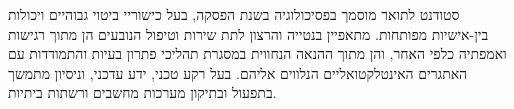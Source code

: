 \begin{minipage}[t]{1\linewidth}
	\vspace{0.25cm} %
	סטודנט לתואר מוסמך בפסיכולוגיה בשנת הפסקה, בעל כישוריי ביטוי גבוהיים ויכולות בין-אישיות מפותחות. מתאפיין בנטייה והרצון לתת שירות וטיפול הנובעים הן מתוך רגישות ואמפתיה כלפי האחר, והן מתוך ההנאה הנחווית במסגרת תהליכי פתרון בעיות והתמודדות עם האתגרים האינטלקטואליים הנלווים אליהם. בעל רקע טכני, ידע עדכני, וניסיון מתמשך בתפעול ובתיקון מערכות מחשבים ורשתות ביתיות. 
\end{minipage}